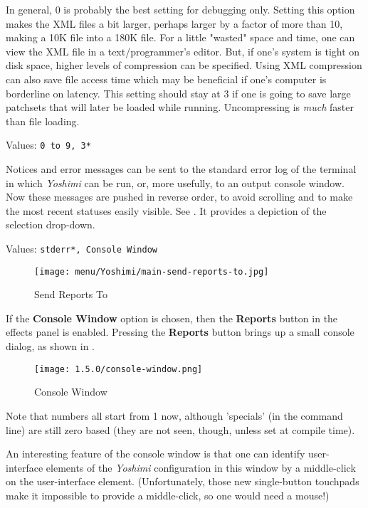    In general, 0 is probably the best setting for debugging only.  Setting this
   option makes the XML files a bit larger, perhaps larger by a factor of more
   than 10, making a 10K file into a 180K file.  For a little "wasted" space
   and time, one can view the XML file in a text/programmer's editor.  But, if
   one's system is tight on disk space, higher levels of compression can be
   specified.  Using XML compression can also save file access time which may
   be beneficial if one's computer is borderline on latency.  This setting
   should stay at 3 if one is going to save large patchsets that will later be
   loaded while running. Uncompressing is \textsl{much} faster than file
   loading.

   Values: \texttt{0 to 9, 3*}

   Notices and error messages can be sent to the standard error log of
   the terminal in which 
   \textsl{Yoshimi} can be run, or, more usefully, to
   an output console window.
   Now these messages are pushed in reverse order, to avoid scrolling
   and to make the most recent statuses easily visible.
   See .
   It provides a depiction of the selection drop-down.

   Values: \texttt{stderr*, Console Window}

\begin{figure}[H]
   \centering 
   \texttt{[image: menu/Yoshimi/main-send-reports-to.jpg]}
   \caption[Send Reports]{Send Reports To}
   \label{fig:send_reports_to}
\end{figure}

   If the \textbf{Console Window} option is chosen, then the
   \textbf{Reports} button in the effects panel is enabled.
   Pressing the \textbf{Reports} button brings up a small console dialog, as
   shown in .

\begin{figure}[H]
   \centering 
   \texttt{[image: 1.5.0/console-window.png]}
   \caption[Yoshimi Console Window]{Console Window}
   \label{fig:console_window}
\end{figure}

    Note that numbers all start from 1 now, although 'specials' (in the command
    line) are still zero based (they are not seen, though,
    unless set at compile time).

   An interesting feature of the console window is that one can identify
   user-interface elements of the \textsl{Yoshimi} configuration in this window
   by a middle-click on the user-interface element.
   (Unfortunately, those new single-button touchpads make it impossible to
   provide a middle-click, so one would need a mouse!)

